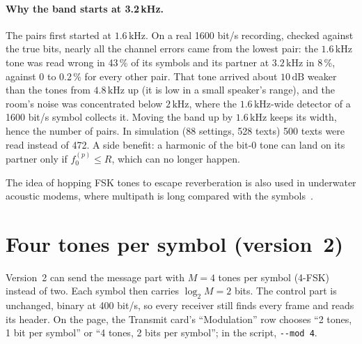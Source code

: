 \documentclass[11pt,a4paper]{article}
\newcommand{\kHz}{\,\mathrm{kHz}}
\newcommand{\dB}{\,\mathrm{dB}}
\newcommand{\code}[1]{\texttt{#1}}
\theoremstyle{remark}
\begin{document}
\paragraph{Why the band starts at 3.2\,kHz.}
The pairs first started at $1.6\kHz$. On a real 1600 bit/s recording, checked against the true bits, nearly all the channel errors came from the lowest pair: the $1.6\kHz$ tone was read wrong in 43\,\% of its symbols and its partner at $3.2\kHz$ in 8\,\%, against 0 to 0.2\,\% for every other pair. That tone arrived about $10\dB$ weaker than the tones from $4.8\kHz$ up (it is low in a small speaker's range), and the room's noise was concentrated below $2\kHz$, where the $1.6\kHz$-wide detector of a 1600 bit/s symbol collects it. Moving the band up by $1.6\kHz$ keeps its width, hence the number of pairs. In simulation (88 settings, 528 texts) 500 texts were read instead of 472. A side benefit: a harmonic of the bit-0 tone can land on its partner only if $f_0^{(p)} \le R$, which can no longer happen.

The idea of hopping FSK tones to escape reverberation is also used in underwater acoustic modems, where multipath is long compared with the symbols~\cite{kilfoyle,whoi}.

\section{Four tones per symbol (version~2)}
\label{sec:mfsk}
Version~2 can send the message part with $M = 4$ tones per symbol (4-FSK) instead of two. Each symbol then carries $\log_2 M = 2$ bits. The control part is unchanged, binary at 400 bit/s, so every receiver still finds every frame and reads its header. On the page, the Transmit card's ``Modulation'' row chooses ``2 tones, 1 bit per symbol'' or ``4 tones, 2 bits per symbol''; in the script, \code{-{}-mod 4}.
\end{document}
